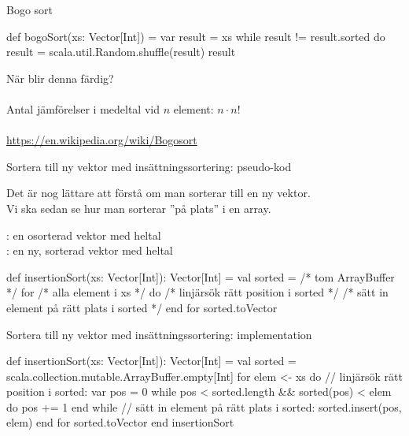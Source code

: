 \begin{Slide}{Bogo sort}
\begin{Code}
def bogoSort(xs: Vector[Int]) = 
  var result = xs
  while result != result.sorted do
    result = scala.util.Random.shuffle(result)
  result
\end{Code}
När blir denna färdig? \pause \\~\\
Antal jämförelser i medeltal vid $n$ element: $ n \cdot n!$ \\~\\
\url{https://en.wikipedia.org/wiki/Bogosort}

\end{Slide}


\begin{Slide}{Sortera till ny vektor med insättningssortering: pseudo-kod}

{\SlideFontSmall Det är nog lättare att förstå  om man sorterar till en ny vektor. \\ Vi ska sedan se hur man sorterar ''på plats''  i en  array.\\} \vspace{0.5em}

\noindent {}: en osorterad vektor med heltal \\
: en ny, sorterad vektor med heltal
\begin{Code}
def insertionSort(xs: Vector[Int]): Vector[Int] = 
  val sorted = /* tom ArrayBuffer */
  for /* alla element i xs */ do
     /* linjärsök rätt position i sorted */
     /* sätt in element på rätt plats i sorted */
  end for
  sorted.toVector
\end{Code}
\end{Slide}


\begin{Slide}{Sortera till ny vektor med insättningssortering: implementation} %
\begin{Code}
def insertionSort(xs: Vector[Int]): Vector[Int] = 
  val sorted = scala.collection.mutable.ArrayBuffer.empty[Int]
  for elem <- xs do
     // linjärsök rätt position i sorted:
     var pos = 0
     while pos < sorted.length && sorted(pos) < elem do
       pos += 1
     end while
     // sätt in element på rätt plats i sorted:
     sorted.insert(pos, elem)
  end for
  sorted.toVector
end insertionSort
\end{Code}
\end{Slide}

